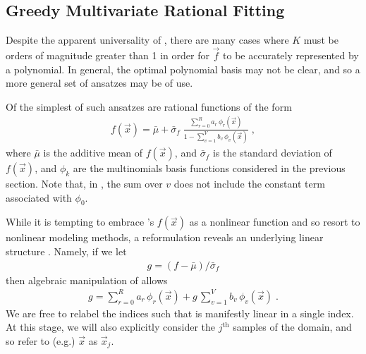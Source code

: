 \documentclass[twocolumn,aps,prd,floatfix,preprintnumbers,a4paper,nofootinbib,
superscriptaddress,10pt]{revtex4-1}
\begin{document}
\subsection{Greedy Multivariate Rational Fitting}
%
%
\par Despite the apparent universality of , there are many cases where $K$ must be orders of magnitude greater than 1 in order for $\vec{f}$ to be accurately represented by a polynomial.
%
In general, the optimal polynomial basis may not be clear, and so a more general set of ansatzes may be of use.
%
\par Of the simplest of such ansatzes are rational functions of the form
%
\def\muf{\bar{\mu}}
\def\sif{\bar{\sigma}_f}
\begin{align}
  \label{eq:rat1}
  f(\vec{x}) = \muf + \sif \; \frac{ \sum_{r=0}^{R} a_r \, \phi_{r}(\vec{x}) }{ 1 - \sum_{v=1}^{V} b_v \, \phi_{v}(\vec{x}) } \;,
\end{align}
%
where $\muf$ is the additive mean of $f(\vec{x})$, and $\sif$ is the standard deviation of $f(\vec{x})$, and $\phi_k$ are the multinomials basis functions considered in the previous section.
%
Note that, in , the sum over $v$ does not include the constant term associated with $\phi_0$.
%
\par While it is tempting to embrace 's $f({\vec{x}})$ as a nonlinear function and so resort to nonlinear modeling methods, a reformulation reveals an underlying linear structure \cite{Press:1992:NRC:148286}.
%
Namely, if we let
%
\begin{align}
  g = (f - \muf)/\sif
\end{align}
%
then algebraic manipulation of  allows
%
\begin{align}
  \label{eq:rat2}
  g = \sum_{r=0}^{R} a_r \, \phi_{r}(\vec{x}) + g\, \sum_{v=1}^{V} b_v \, \phi_{v}(\vec{x}) \; .
\end{align}
%
We are free to relabel the indices such that  is manifestly linear in a single index.
%
At this stage, we will also explicitly consider the $j^\mathrm{th}$ samples of the domain, and so refer to (e.g.) $\vec{x}$ as $\vec{x}_j$.
%
%
\end{document}
